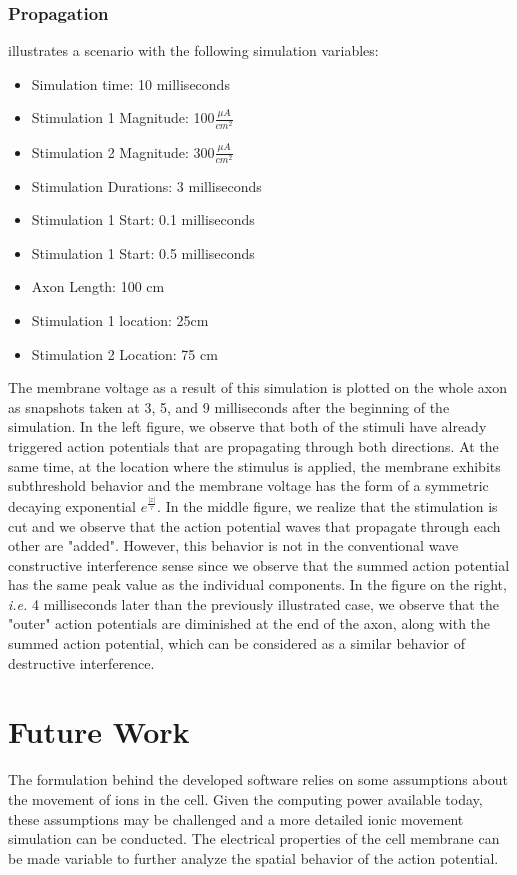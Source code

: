 \documentclass{IEEEtran}
\begin{document}
\subsubsection{Propagation}
 illustrates a scenario with the following simulation variables:
\begin{itemize}
    \item Simulation time: 10 milliseconds
    \item Stimulation 1 Magnitude: 100$\frac{\mu A}{cm^2}$
    \item Stimulation 2 Magnitude: 300$\frac{\mu A}{cm^2}$
    \item Stimulation Durations: 3 milliseconds
    \item Stimulation 1 Start: 0.1 milliseconds
    \item Stimulation 1 Start: 0.5 milliseconds
    \item Axon Length: 100 cm
    \item Stimulation 1 location: 25cm
    \item Stimulation 2 Location: 75 cm
\end{itemize}
The membrane voltage as a result of this simulation is plotted on the whole axon as snapshots taken at 3, 5, and 9 milliseconds after the beginning of the simulation. In the left figure, we observe that both of the stimuli have already triggered action potentials that are propagating through both directions. At the same time, at the location where the stimulus is applied, the membrane exhibits subthreshold behavior and the membrane voltage has the form of a symmetric decaying exponential $e^\frac{|z|}{\tau}$. In the middle figure, we realize that the stimulation is cut and we observe that the action potential waves that propagate through each other are "added". However, this behavior is not in the conventional wave constructive interference sense since we observe that the summed action potential has the same peak value as the individual components. In the figure on the right, \textit{i.e.} 4 milliseconds later than the previously illustrated case, we observe that the "outer" action potentials are diminished at the end of the axon, along with the summed action potential, which can be considered as a similar behavior of destructive interference.


\section{Future Work}
The formulation behind the developed software relies on some assumptions about the movement of ions in the cell. Given the computing power available today, these assumptions may be challenged and a more detailed ionic movement simulation can be conducted. The electrical properties of the cell membrane can be made variable to further analyze the spatial behavior of the action potential.
\end{document}
